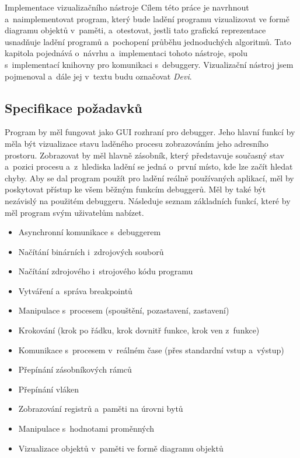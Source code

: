 \documentclass[czech,bachelor,male,python,dept460,hidelinks]{diploma}						%
\begin{document}
\begin{section}{Implementace vizualizačního nástroje}
\label{sec:DeviImplementation}
  Cílem této práce je navrhnout a~naimplementovat program, který bude ladění programu vizualizovat ve formě diagramu objektů v~paměti, a~otestovat,
	jestli tato grafická reprezentace usnadňuje ladění programů a~pochopení průběhu jednoduchých algoritmů.
	Tato kapitola pojednává o~návrhu a~implementaci tohoto nástroje, spolu s~implementací knihovny pro komunikaci s~debuggery.
	Vizualizační nástroj jsem pojmenoval a~dále jej v~textu budu označovat \textit{Devi}.
	
	\subsection{Specifikace požadavků}
	Program by měl fungovat jako GUI rozhraní pro debugger. Jeho hlavní funkcí by měla být vizualizace stavu laděného procesu zobrazováním jeho
	adresního prostoru. Zobrazovat by měl hlavně zásobník, který představuje současný stav a~pozici procesu a~z~hlediska ladění se jedná o~první místo,
	kde lze začít hledat chyby.
	Aby se dal program použít pro ladění reálně používaných aplikací, měl by poskytovat přístup ke všem běžným
	funkcím debuggerů. Měl by také být nezávislý na použitém debuggeru. Následuje seznam základních funkcí, které by měl program svým uživatelům nabízet.
	
	\begin{itemize}
		\item Asynchronní komunikace s~debuggerem
		\item Načítání binárních i~zdrojových souborů
		\item Načítání zdrojového i~strojového kódu programu
		\item Vytváření a~správa breakpointů
		\item Manipulace s~procesem (spouštění, pozastavení, zastavení)
		\item Krokování (krok po řádku, krok dovnitř funkce, krok ven z~funkce)
		\item Komunikace s~procesem v~reálném čase (přes standardní vstup a~výstup)
		\item Přepínání zásobníkových rámců
		\item Přepínání vláken
		\item Zobrazování registrů a~paměti na úrovni bytů
		\item Manipulace s~hodnotami proměnných
		\item Vizualizace objektů v~paměti ve formě diagramu objektů
	\end{itemize}
	

\end{section}
\end{document}
